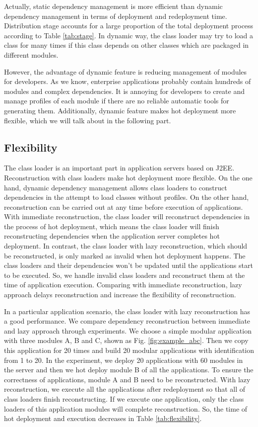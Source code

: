 \documentclass[conference]{IEEEtran}
\begin{document}
Actually, static dependency management is more efficient than dynamic dependency management in terms of deployment and redeployment time.
Distribution stage accounts for a large proportion of the total deployment process according to Table \ref{tab:stage}.
In dynamic way, the class loader may try to load a class for many times if this class depends on other classes which are packaged in different modules.

However, the advantage of dynamic feature is reducing management of modules for developers.
As we know, enterprise applications probably contain hundreds of modules and complex dependencies.
It is annoying for developers to create and manage profiles of each module if there are no reliable automatic tools for generating them.
Additionally, dynamic feature makes hot deployment more flexible, which we will talk about in the following part.


\subsection{Flexibility}

The class loader is an important part in application servers based on J2EE.
Reconstruction with class loaders make hot deployment more flexible.
On the one hand, dynamic dependency management allows class loaders to construct dependencies in the attempt to load classes without profiles.
On the other hand, reconstruction can be carried out at any time before execution of applications.
With immediate reconstruction, the class loader will reconstruct dependencies in the process of hot deployment, which means the class loader will finish reconstructing dependencies when the application server completes hot deployment.
In contrast, the class loader with lazy reconstruction, which should be reconstructed, is only marked as invalid when hot deployment happens.
The class loaders and their dependencies won't be updated until the applications start to be executed.
So, we handle invalid class loaders and reconstruct them at the time of application execution.
Comparing with immediate reconstruction, lazy approach delays reconstruction and increase the flexibility of reconstruction.

In a particular application scenario, the class loader with lazy reconstruction has a good performance. 
We compare dependency reconstruction between immediate and lazy approach through experiments.
We choose a simple modular application with three modules A, B and C, shown as Fig. \ref{fig:example_abc}.
Then we copy this application for 20 times and build 20 modular applications with identification from 1 to 20.
In the experiment, we deploy 20 applications with 60 modules in the server and then we hot deploy module B of all the applications.
To ensure the correctness of applications, module A and B need to be reconstructed.
With lazy reconstruction, we execute all the applications after redeployment so that all of class loaders finish reconstructing.
If we execute one application, only the class loaders of this application modules will complete reconstruction.
So, the time of hot deployment and execution decreases in Table \ref{tab:flexibility}. 
\end{document}
